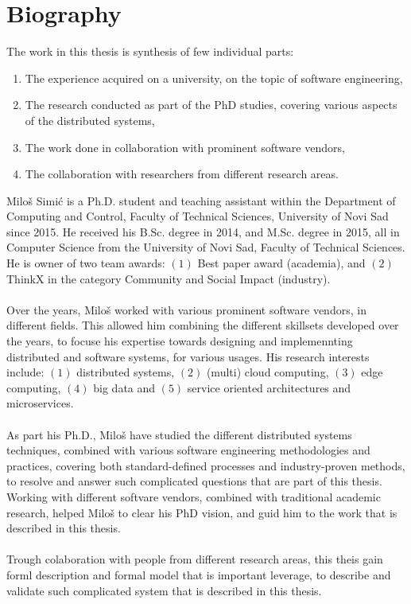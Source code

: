 \chapter*{Biography}
%
The work in this thesis is synthesis of few individual parts:

\begin{enumerate}[start=1,label={(\bfseries \arabic*)}]
	\item The experience acquired on a university, on the topic of software engineering,
	\item The research conducted as part of the PhD studies, covering various aspects of the distributed systems,
	\item The work done in collaboration with prominent software vendors,
	\item The collaboration with researchers from different research areas.
\end{enumerate}

\noindent
Milo\v s Simi\'c is a Ph.D. student and teaching assistant within the Department of Computing and Control, Faculty of Technical Sciences, University of Novi Sad since 2015. He received his B.Sc. degree in 2014, and M.Sc. degree in 2015, all in Computer Science from the University of Novi Sad, Faculty of Technical Sciences. He is owner of two team awards: $(1)$ Best paper award (academia), and $(2)$ ThinkX in the category Community and Social Impact (industry).\\\\ 
\noindent
Over the years, Milo\v s worked with various prominent software vendors, in different fields. This allowed him combining the different skillsets developed over the years, to focuse his expertise towards designing and implemennting distributed and software systems, for various usages. His research interests include: $(1)$ distributed systems, $(2)$ (multi) cloud computing, $(3)$ edge computing, $(4)$ big data and $(5)$ service oriented architectures and microservices.\\\\
\noindent
As part his Ph.D., Milo\v s have studied the different distributed systems techniques, combined with various software engineering methodologies and practices, covering both standard-defined processes and industry-proven methods, to resolve and answer such complicated questions that are part of this thesis. Working with different softvare vendors, combined with traditional academic research, helped Milo\v s to clear his PhD vision, and guid him to the work that is described in this thesis.\\\\
\noindent
Trough colaboration with people from different research areas, this theis gain forml description and formal model that is important leverage, to describe and validate such complicated system that is described in this thesis.
%
%